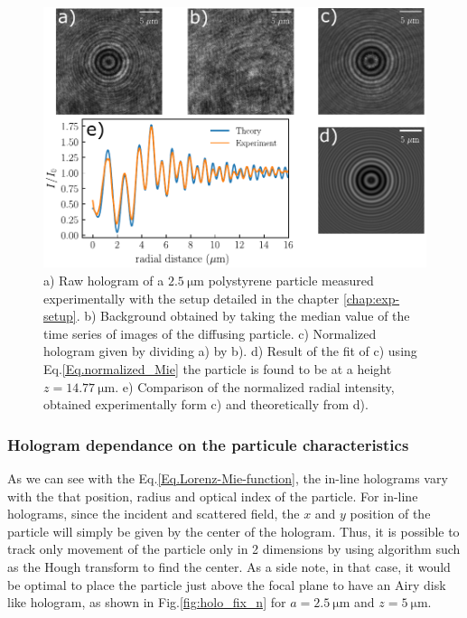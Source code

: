 \begin{figure}[H]
	\centering
	\includegraphics[scale=1]{02_body/chapter2/images/lorenz_mie_fit_demo/plot_lorenz_mie.pdf}
	\caption{a) Raw hologram of a $2.5 ~ \mathrm{\mu m}$ polystyrene particle measured experimentally with the setup detailed in the chapter \ref{chap:exp-setup}. b) Background obtained by taking the median value of the time series of images of the diffusing particle. c) Normalized hologram given by dividing a) by b). d) Result of the fit of c) using Eq.{\ref{Eq.normalized_Mie}} the particle is found to be at a height $z = 14.77 ~ \mathrm{\mu m}$. e) Comparison of the normalized radial intensity, obtained experimentally form c) and theoretically from d).}
	\label{fig.Lorenz_mie_demo}
\end{figure}

\subsubsection{Hologram dependance on the particule characteristics}



As we can see with the Eq.\ref{Eq.Lorenz-Mie-function}, the in-line holograms vary with the that position, radius and optical index of the particle. For in-line holograms, since the incident and scattered field, the $x$ and $y$ position of the particle will simply be given by the center of the hologram. Thus, it is possible to track only movement of the particle only in 2 dimensions by using algorithm such as the Hough transform to find the center. As a side note, in that case, it would be optimal to place the particle just above the focal plane to have an Airy disk like hologram, as shown in Fig.\ref{fig:holo_fix_n} for $a = 2.5 ~ \mathrm{\mu m}$ and $z = 5 ~\mathrm{\mu m}$.

